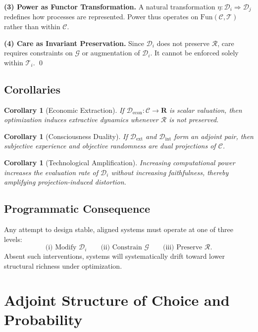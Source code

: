 \documentclass[11pt,a4paper]{article}
\newtheorem{corollary}[theorem]{Corollary}
\theoremstyle{definition}
\theoremstyle{remark}
\begin{document}
\textbf{(3) Power as Functor Transformation.} A natural transformation $\eta : \mathcal{D}_i \Rightarrow \mathcal{D}_j$ redefines how processes are represented. Power thus operates on $\mathrm{Fun}(\mathcal{C}, \mathcal{T})$ rather than within $\mathcal{C}$.

\textbf{(4) Care as Invariant Preservation.} Since $\mathcal{D}_i$ does not preserve $\mathcal{R}$, care requires constraints on $\mathcal{G}$ or augmentation of $\mathcal{D}_i$. It cannot be enforced solely within $\mathcal{T}_i$. \qed

\subsection{Corollaries}

\begin{corollary}[Economic Extraction]
If $\mathcal{D}_{\mathrm{econ}} : \mathcal{C} \to \mathbf{R}$ is scalar valuation, then optimization induces extractive dynamics whenever $\mathcal{R}$ is not preserved.
\end{corollary}

\begin{corollary}[Consciousness Duality]
If $\mathcal{D}_{\mathrm{ext}}$ and $\mathcal{D}_{\mathrm{int}}$ form an adjoint pair, then subjective experience and objective randomness are dual projections of $\mathcal{C}$.
\end{corollary}

\begin{corollary}[Technological Amplification]
Increasing computational power increases the evaluation rate of $\mathcal{D}_i$ without increasing faithfulness, thereby amplifying projection-induced distortion.
\end{corollary}

\subsection{Programmatic Consequence}

Any attempt to design stable, aligned systems must operate at one of three levels:
\[
\text{(i)\ Modify } \mathcal{D}_i \qquad \text{(ii)\ Constrain } \mathcal{G} \qquad \text{(iii)\ Preserve } \mathcal{R}.
\]
Absent such interventions, systems will systematically drift toward lower structural richness under optimization.

\section{Adjoint Structure of Choice and Probability}
\end{document}
